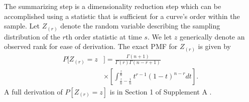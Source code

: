 \documentclass[12pt]{article}
\theoremstyle{plain}
\theoremstyle{remark}
\begin{document}
	The summarizing step is a dimensionality reduction step which can be accomplished using a statistic that is sufficient for a curve's order within the sample. Let $Z_{(r)}$ denote the random variable describing the sampling distribution of the $r$th order statistic at time $s$. We let $z$ generically denote an observed rank for ease of derivation. The exact PMF for $Z_{(r)}$ is given by
\begin{align}
	P\bigg[ Z_{(r)} = z &\bigg] =  \frac{\Gamma(n+1)}{\Gamma(r)\Gamma(n - r + 1)} \label{eq:pzr}\\
	&\times \left[ \int_{\frac{z}{n}-\frac{1}{n}}^{\frac{z}{n}} t^{r-1}\left(1-t\right)^{n-r } dt \right].\nonumber
\end{align}
A full derivation of $P\left[ Z_{(r)} = z \right]$ is in Section 1 of Supplement A \citep{DRTSup2024A}.
\end{document}
